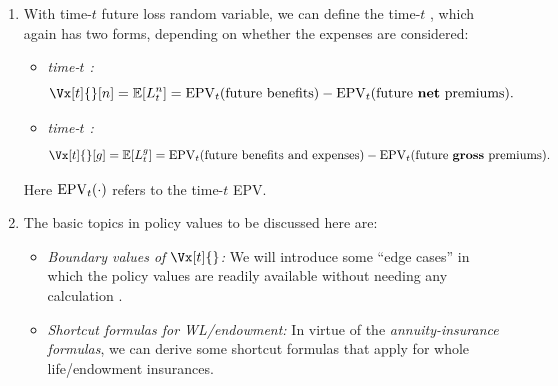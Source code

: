 \begin{enumerate}
\begin{warning}
Very often, this convention amounts to (i) excluding all \underline{benefits}
and \underline{benefit}-related expenses at that time (as they are mostly
end-of-period payments, for insurance at least), and (ii) including all
\underline{premiums} and \underline{premium}-related expenses at that time (as
they are most start-of-period payments).
\end{warning}
\item With time-\(t\) future loss random variable, we can define the
time-\(t\) , which again has two forms, depending on whether
the expenses are considered:
\begin{itemize}
\item \emph{time-\(t\) :}
\[\Vx[t]{}[n]=\expv{L_t^n}
=\epvt{t}{\text{future benefits}}-\epvt{t}{\text{future \textbf{net} premiums}}.\]
\item \emph{time-\(t\) :}
\[\Vx[t]{}[g]=\expv{L_t^g}
=\epvt{t}{\text{future benefits and expenses}}-\epvt{t}{\text{future \textbf{gross} premiums}}.\]
\end{itemize}
Here \(\operatorname{EPV}_{t}(\cdot)\) refers to the time-\(t\) EPV.


\item The basic topics in policy values to be discussed here are:
\begin{itemize}
\item \emph{Boundary values of \(\Vx[t]{}\):} We will introduce some ``edge
cases'' in which the policy values are readily available without needing any
calculation .
\item \emph{Shortcut formulas for WL/endowment:} In virtue of the
\emph{annuity-insurance formulas}, we can derive some shortcut formulas that
apply for whole life/endowment insurances.
\end{itemize}


\end{enumerate}
